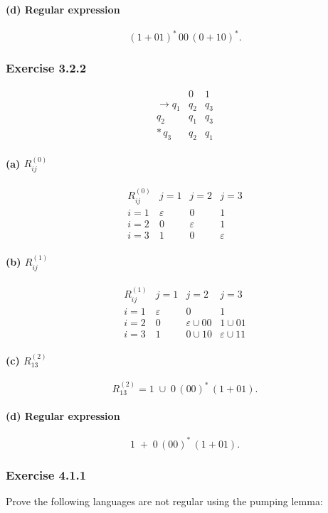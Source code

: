 \documentclass{article}
\theoremstyle{theorem}
\theoremstyle{definition}
\theoremstyle{remark}
\begin{document}
\paragraph{(d) Regular expression}
\[
(1 + 01)^*\,00\,(0 + 10)^*.
\]

\subsubsection*{Exercise 3.2.2}
\[
\begin{array}{c|cc}
     &0&1\\\hline
\to q_1 & q_2 & q_3\\
      q_2 & q_1 & q_3\\
*\,q_3 & q_2 & q_1
\end{array}
\]
\paragraph{(a) \(R_{ij}^{(0)}\)}
\[
\begin{array}{c|ccc}
R_{ij}^{(0)} & j=1 & j=2 & j=3\\\hline
i=1 & \varepsilon & 0 & 1\\
i=2 & 0 & \varepsilon & 1\\
i=3 & 1 & 0 & \varepsilon
\end{array}
\]
\paragraph{(b) \(R_{ij}^{(1)}\)}
\[
\begin{array}{c|ccc}
R_{ij}^{(1)} & j=1 & j=2 & j=3\\\hline
i=1 & \varepsilon & 0 & 1\\
i=2 & 0 & \varepsilon\cup00 & 1\cup01\\
i=3 & 1 & 0\cup10 & \varepsilon\cup11
\end{array}
\]
\paragraph{(c) \(R_{13}^{(2)}\)}
\[
R_{13}^{(2)} = 1 \;\cup\;0\,(00)^*\,(1+01).
\]
\paragraph{(d) Regular expression}
\[
1 \;+\;0\,(00)^*\,(1+01).
\]

\subsubsection*{Exercise 4.1.1}
Prove the following languages are not regular using the pumping lemma:
\end{document}
